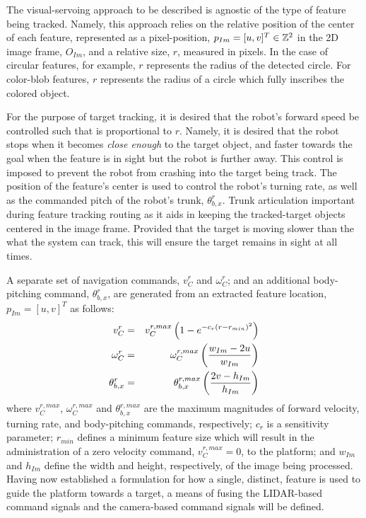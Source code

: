 			The visual-servoing approach to be described is agnostic of the type of feature being tracked. Namely, this approach relies on the relative position of the center of each feature, represented as a pixel-position, $p_{Im} = [u,v]^{T} \in {\Bbb Z}^{2}$ in the 2D image frame, $O_{Im}$, and a relative size, $r$, measured in pixels. In the case of circular features, for example, $r$ represents the radius of the detected circle. For color-blob features, $r$ represents the radius of a circle which fully inscribes the colored object.

			For the purpose of target tracking, it is desired that the robot's forward speed be controlled such that is proportional to $r$. Namely, it is desired that the robot stops when it becomes \emph{close enough} to the target object, and faster towards the goal when the feature is in sight but the robot is further away. This control is imposed to prevent the robot from crashing into the target being track. The position of the feature's center is used to control the robot's turning rate, as well as the commanded pitch of the robot's trunk, $\theta_{b,x}^{r}$. Trunk articulation important during feature tracking routing as it aids in keeping the tracked-target objects centered in the image frame. Provided that the target is moving slower than the what the system can track, this will ensure the target remains in sight at all times.

			A separate set of navigation commands, $v_{C}^{r}$ and $\omega_{C}^{r}$; and an additional body-pitching command, $\theta_{b,x}^{r}$,  are generated from an extracted feature location, $p_{Im} = [u,v]^{T}$ as follows: 
				\begin{eqnarray}
					v_{C}^{r} 			& = & v_{C}^{r,max} \left( 1 - e^{ -c_{r} \left( r-r_{min} \right)^{2} } \right) 	\nonumber 	\\
					\omega_{C}^{r} 	& = & \omega_{C}^{r,max} \left(\frac{ w_{Im} - 2 u  }{ w_{Im} } \right)		\nonumber 	\\
					\theta_{b,x}^{r}	& = & \theta_{b,x}^{r,max} \left( \frac{ 2 v - h_{Im} }{ h_{Im} } \right) 		
				\end{eqnarray}
			where $v_{C}^{r,max}$, $\omega_{C}^{r,max}$ and $\theta_{b,x}^{r,max}$ are the maximum magnitudes of forward velocity, turning rate, and body-pitching commands, respectively; $c_{r}$ is a sensitivity parameter; $r_{min}$ defines a minimum feature size which will result in the administration of a zero velocity command, $v_{C}^{r,max}=0$, to the platform; and $w_{Im}$ and $h_{Im}$ define the width and height, respectively, of the image being processed. Having now established a formulation for how a single, distinct, feature is used to guide the platform towards a target, a means of fusing the LIDAR-based command signals and the camera-based command signals will be defined.

